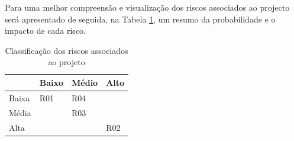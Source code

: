 Para uma melhor compreensão e visualização dos riscos associados ao projecto será apresentado de seguida, na Tabela \ref{tab:riscos}, um resumo da probabilidade e o impacto de cada risco.

\begin{table}[ht!]
	\centering
\begin{tabular}{ | l | l | l | l |}
	\hline
	\diagbox[width=15em]{Impacto}{Probabilidade}
	& Baixo & Médio & Alto\\
	\hline
	Baixa & \cellcolor{green}\centering R01 & \cellcolor{yellow}R04& \cellcolor{orange}\\
	\hline
	Média & \cellcolor{yellow} & \cellcolor{orange}R03 & \cellcolor{darkOrange}\\
	\hline
	Alta & \cellcolor{orange} & \cellcolor{darkOrange} & \cellcolor{red}R02\\
	\hline
\end{tabular}
\begin{center}
\caption {Classificação dos riscos associados ao projeto}
\label {tab:riscos}
\end{center}
\end{table}










\blankpage

\glsresetall
